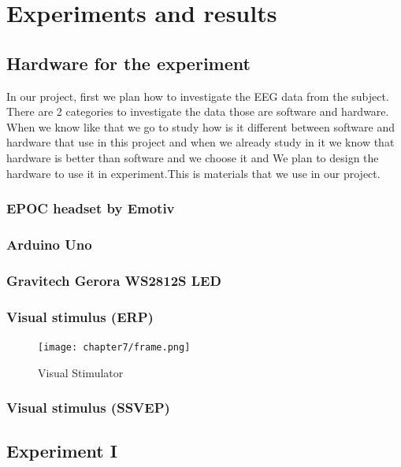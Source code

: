 \chapter{Experiments and results}

\label{ch:Experiments and results}

\setlength{\parindent}{4em}
\setlength{\parskip}{1em}
\renewcommand{\baselinestretch}{1.5}

\section{Hardware for the experiment}

In our project, first we plan how to investigate the EEG data from the subject. There are 2 categories to investigate the data those are software and hardware. When we know like that we go to study how is it different between software and hardware that use in this project and when we already study in it we know that hardware is better than software and we choose it and We plan to design the hardware to use it in experiment.This is materials that we use in our project.

\subsection{EPOC headset by Emotiv}

\subsection{Arduino Uno}

\subsection{Gravitech Gerora WS2812S LED}

\subsection{Visual stimulus (ERP)}
\begin{figure}[ht]
	\centering
	\texttt{[image: chapter7/frame.png]}
	\caption{Visual Stimulator}
\end{figure}
\subsection{Visual stimulus (SSVEP)}

\newpage
\section{Experiment I}
